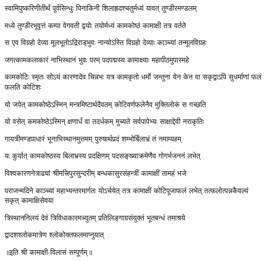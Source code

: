

\twolineshloka
{स्वामिपुष्करिणीतीर्थं पूर्वसिन्धुः पिनाकिनी}
{शिलाह्रदश्चतुर्मध्यं यावत् तुण्डीरमण्डलम्}

\twolineshloka
{मध्ये तुण्डीरभूवृत्तं कम्पा वेगवती द्वयोः}
{तयोर्मध्यं कामकोष्ठं कामाक्षी तत्र वर्तते}

\twolineshloka
{स एव विग्रहो देव्या मूलभूतोऽद्रिराड्भुवः}
{नान्योऽस्ति विग्रहो देव्याः काञ्च्यां तन्मूलविग्रहः}

\twolineshloka
{जगत्कामकलाकारं नाभिस्थानं भुवः परम्}
{पदपद्मस्य कामाक्ष्याः महापीठमुपास्महे}

\threelineshloka
{कामकोटिः स्मृतः सोऽयं कारणादेव चिन्नभः}
{यत्र कामकृतो धर्मो जन्तुना येन केन वा}
{सकृद्वाऽपि सुधर्माणां फलं फलति कोटिशः}

\twolineshloka
{यो जपेत् कामकोष्ठेऽस्मिन् मन्त्रमिष्टार्थदैवतम्}
{कोटिवर्णफलेनैव मुक्तिलोकं स गच्छति}

\twolineshloka
{यो वसेत् कमकोष्ठेऽस्मिन् क्षणार्धं वा तदर्धकम्}
{मुच्यते सर्वपापेभ्यः साक्षाद्देवी नराकृतिः}

\twolineshloka
{गायत्रीमण्डपाधारं भूनाभिस्थानमुत्तमम्}
{पुरुषार्थप्रदं शम्भोर्बिलाभ्रं तं नमाम्यहम्}

\twolineshloka
{यः कुर्यात् कामकोष्ठस्य बिलाभ्रस्य प्रदक्षिणम्}
{पदसङ्ख्याक्रमेणैव गोगर्भजननं लभेत्}

\twolineshloka
{विश्वकारणनेत्राढ्यां श्रीमत्त्रिपुरसुन्दरीम्}
{बन्धकासुरसंहन्त्रीं कामाक्षीं तामहं भजे}

\threelineshloka
{पराजन्मदिने काञ्च्यां महाभ्यन्तरमार्गतः}
{योऽर्चयेत् तत्र कामाक्षीं कोटिपूजाफलं लभेत्}
{तत्फलोत्पन्नकैवल्यं सकृत् कामाक्षिसेवया}

\twolineshloka
{त्रिस्थाननिलयं देवं त्रिविधाकारमच्युतम्}
{प्रतिलिङ्गाग्रसंयुक्तं भूतबन्धं तमाश्रये}

{द्वादशश्लोकमात्रेण श्लोकोक्तफलमाप्नुयात्}

॥इति श्री कामाक्षी-विलासं सम्पूर्णम्॥